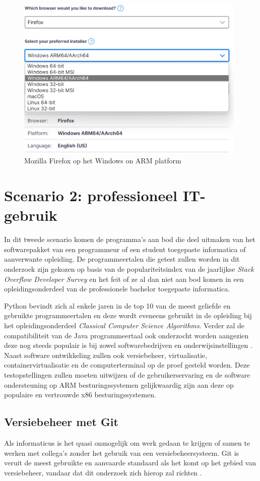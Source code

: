 \begin{figure}[!h]
	\centering
	\includegraphics[width=110mm, scale=0.7]{img/firefox_winARM.png}
	\caption{Mozilla Firefox op het Windows on ARM platform \autocite{Mozilla2022}}
\end{figure}

\section{Scenario 2: professioneel IT-gebruik}
In dit tweede scenario komen de programma’s aan bod die deel uitmaken van het softwarepakket van een programmeur of een student toegepaste informatica of aanverwante opleiding. De programmeertalen die getest zullen worden in dit onderzoek zijn gekozen op basis van de populariteitsindex van de jaarlijkse \textit{Stack Overflow Developer Survey} en het feit of ze al dan niet aan bod komen in een opleidingsonderdeel van de professionele bachelor toegepaste informatica.

Python bevindt zich al enkele jaren in de top 10 van de meest geliefde en gebruikte programmeertalen en deze wordt eveneens gebruikt in de opleiding bij het opleidingsonderdeel \textit{Classical Computer Science Algorithms}. Verder zal de compatibiliteit van de Java programmeertaal ook onderzocht worden aangezien deze nog steeds populair is bij zowel softwarebedrijven en onderwijsinstellingen \autocite{StackOverflow2020}. Naast software ontwikkeling zullen ook versiebeheer, virtualisatie, containervirtualisatie en de computerterminal op de proef gesteld worden. Deze testopstellingen zullen moeten uitwijzen of de gebruikerservaring en de software ondersteuning op ARM besturingssystemen gelijkwaardig zijn aan deze op populaire en vertrouwde x86 besturingssystemen.

\subsection{Versiebeheer met Git}
Als informaticus is het quasi onmogelijk om werk gedaan te krijgen of samen te werken met collega’s zonder het gebruik van een versiebeheersysteem. Git is veruit de meest gebruikte en aanvaarde standaard als het komt op het gebied van versiebeheer, vandaar dat dit onderzoek zich hierop zal richten \autocite{Banerjee2022}.

